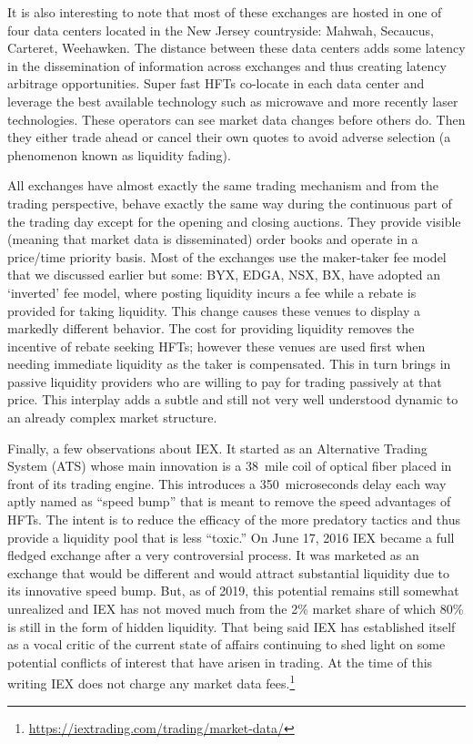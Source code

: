 It is also interesting to note that most of these exchanges are hosted in one of four data centers located in the New Jersey countryside: Mahwah, Secaucus, Carteret, Weehawken. The distance between these data centers adds some latency in the dissemination of information across exchanges and thus creating latency arbitrage opportunities. Super fast HFTs co-locate in each data center and leverage the best available technology such as microwave and more recently laser technologies. These operators can see market data changes before others do. Then they either trade ahead or cancel their own quotes to avoid adverse selection (a phenomenon known as liquidity fading).


All exchanges have almost exactly the same trading mechanism and from the trading perspective, behave exactly the same way during the continuous part of the trading day except for the opening and closing auctions. They provide visible (meaning that market data is disseminated) order books and operate in a price/time priority basis. Most of the exchanges use the maker-taker fee model\label{in:takerfee2} that we discussed earlier but some: BYX, EDGA, NSX, BX, have adopted an `inverted' fee model, where posting liquidity incurs a fee while a rebate is provided for taking liquidity. This change causes these venues to display a markedly different behavior. The cost for providing liquidity removes the incentive of rebate seeking HFTs; however  these venues are used first when needing immediate liquidity as the taker is compensated. This in turn brings in passive liquidity providers who are willing to pay for trading passively at that price. This interplay adds a subtle and still not very well understood dynamic to an already complex market structure.


Finally, a few observations about IEX. It started as an Alternative Trading System (ATS) whose main innovation is a 38~mile coil of optical fiber placed in front of its trading engine. This introduces a 350~microseconds delay each way aptly named as ``speed bump'' that is meant to remove the speed advantages of HFTs. The intent is to reduce the efficacy of the more predatory tactics and thus provide a liquidity pool that is less ``toxic.'' On June 17, 2016 IEX became a full fledged exchange after a very controversial process. It was marketed as an exchange that would be different and would attract substantial liquidity due to its innovative speed bump. But, as of 2019, this potential remains still somewhat unrealized and IEX has not moved much from the 2\% market share of which 80\% is still in the form of hidden liquidity. That being said IEX has established itself as a vocal critic of the current state of affairs continuing to shed light on some potential conflicts of interest that have arisen in trading. At the time of this writing IEX does not charge any market data fees.\footnote{\url{https://iextrading.com/trading/market-data/}} \twomedskip


